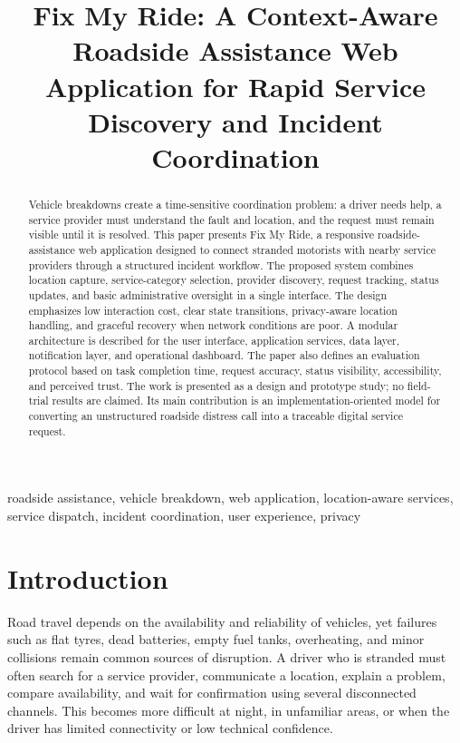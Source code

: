 \documentclass[conference]{IEEEtran}
\begin{document}
\title{Fix My Ride: A Context-Aware Roadside Assistance Web Application for Rapid Service Discovery and Incident Coordination}

\author{
}

\maketitle

\begin{abstract}
Vehicle breakdowns create a time-sensitive coordination problem: a driver needs help, a service provider must understand the fault and location, and the request must remain visible until it is resolved. This paper presents Fix My Ride, a responsive roadside-assistance web application designed to connect stranded motorists with nearby service providers through a structured incident workflow. The proposed system combines location capture, service-category selection, provider discovery, request tracking, status updates, and basic administrative oversight in a single interface. The design emphasizes low interaction cost, clear state transitions, privacy-aware location handling, and graceful recovery when network conditions are poor. A modular architecture is described for the user interface, application services, data layer, notification layer, and operational dashboard. The paper also defines an evaluation protocol based on task completion time, request accuracy, status visibility, accessibility, and perceived trust. The work is presented as a design and prototype study; no field-trial results are claimed. Its main contribution is an implementation-oriented model for converting an unstructured roadside distress call into a traceable digital service request.
\end{abstract}

\begin{IEEEkeywords}
roadside assistance, vehicle breakdown, web application, location-aware services, service dispatch, incident coordination, user experience, privacy
\end{IEEEkeywords}

\section{Introduction}
Road travel depends on the availability and reliability of vehicles, yet failures such as flat tyres, dead batteries, empty fuel tanks, overheating, and minor collisions remain common sources of disruption. A driver who is stranded must often search for a service provider, communicate a location, explain a problem, compare availability, and wait for confirmation using several disconnected channels. This becomes more difficult at night, in unfamiliar areas, or when the driver has limited connectivity or low technical confidence.
\end{document}
